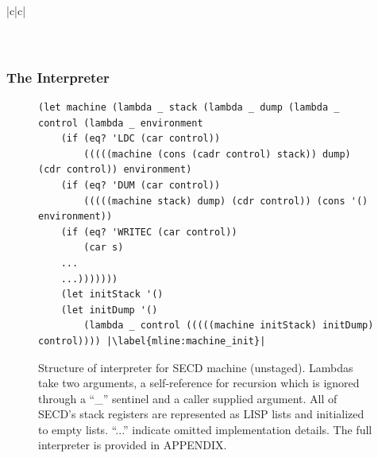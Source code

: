 \documentclass[a4paper,12pt,twoside,openright]{report}
\theoremstyle{definition}
\newcommand{\mslang}{$\lambda_{\uparrow\downarrow}$}
\begin{document}
\begin{table}[htp!]
\begin{tabular}{|c|c|}
\\ \hline
{} \\ \hline
{}
\\ \hline
\end{tabular}
\caption{Example of SECD evaluation and \mslang code generated using our PE framework. The division follows that of table \ref{tbl:secd_division}.}
\label{tbl:secd_example1}
\end{table}


\pagebreak
\subsubsection{The Interpreter}\label{subsec:secd_interp}
\begin{figure}[htp!]
\centering
\begin{verbatim}
(let machine (lambda _ stack (lambda _ dump (lambda _ control (lambda _ environment
    (if (eq? 'LDC (car control))
        (((((machine (cons (cadr control) stack)) dump) (cdr control)) environment)
    (if (eq? 'DUM (car control))
        (((((machine stack) dump) (cdr control)) (cons '() environment))
    (if (eq? 'WRITEC (car control))
        (car s)
    ...
    ...)))))))
    (let initStack '()
    (let initDump '()
        (lambda _ control (((((machine initStack) initDump) control)))) |\label{mline:machine_init}|
\end{verbatim}
\caption{Structure of interpreter for SECD machine (unstaged). Lambdas take two arguments, a self-reference for recursion which is ignored through a ``\_'' sentinel and a caller supplied argument. All of SECD's stack registers are represented as LISP lists and initialized to empty lists. ``...'' indicate omitted implementation details. The full interpreter is provided in APPENDIX.}
\label{lst:secd_unstaged}
\end{figure}
\end{document}
